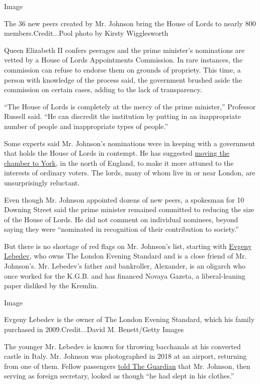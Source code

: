 Image

The 36 new peers created by Mr. Johnson bring the House of Lords to
nearly 800 members.Credit...Pool photo by Kirsty Wigglesworth

Queen Elizabeth II confers peerages and the prime minister's nominations
are vetted by a House of Lords Appointments Commission. In rare
instances, the commission can refuse to endorse them on grounds of
propriety. This time, a person with knowledge of the process said, the
government brushed aside the commission on certain cases, adding to the
lack of transparency.

``The House of Lords is completely at the mercy of the prime minister,''
Professor Russell said. ``He can discredit the institution by putting in
an inappropriate number of people and inappropriate types of people.''

Some experts said Mr. Johnson's nominations were in keeping with a
government that holds the House of Lords in contempt. He has suggested
\href{https://www.bbc.co.uk/news/uk-politics-53432776}{moving the
chamber to York}, in the north of England, to make it more attuned to
the interests of ordinary voters. The lords, many of whom live in or
near London, are unsurprisingly reluctant.

Even though Mr. Johnson appointed dozens of new peers, a spokesman for
10 Downing Street said the prime minister remained committed to reducing
the size of the House of Lords. He did not comment on individual
nominees, beyond saying they were ``nominated in recognition of their
contribution to society.''

But there is no shortage of red flags on Mr. Johnson's list, starting
with
\href{https://www.nytimes.com/2015/01/01/style/the-rise-of-evgeny-lebedev.html}{Evgeny
Lebedev}, who owns The London Evening Standard and is a close friend of
Mr. Johnson's. Mr. Lebedev's father and bankroller, Alexander, is an
oligarch who once worked for the K.G.B. and has financed Novaya Gazeta,
a liberal-leaning paper disliked by the Kremlin.

Image

Evgeny Lebedev is the owner of The London Evening Standard, which his
family purchased in 2009.Credit...David M. Benett/Getty Images

The younger Mr. Lebedev is known for throwing bacchanals at his
converted castle in Italy. Mr. Johnson was photographed in 2018 at an
airport, returning from one of them. Fellow passengers
\href{https://www.theguardian.com/politics/2019/jul/26/boris-johnson-security-evgeny-lebedev-perugia-party}{told
The Guardian} that Mr. Johnson, then serving as foreign secretary,
looked as though ``he had slept in his clothes.''

